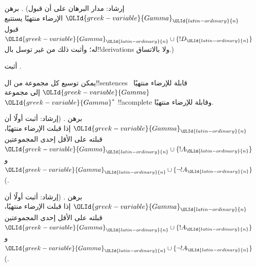 \documentclass[../../../include/open-logic-section]{subfiles}
\begin{document}
\begin{prob}
برهن . (إرشاد: مدار البرهان
على أن قبول ${\OLId{greek-variable}{Gamma}}_{\OLId{latin-ordinary}{n}}$ الإرضاء منتهيًا يستتبع قبول
${\OLId{greek-variable}{Gamma}}_{\OLId{latin-ordinary}{n}} \cup \{!D_{\OLId{latin-ordinary}{n}}\}$ له؛ وأثبت ذلك من غير توسل بال!!{derivation}s
ولا بالاتساق.)
\end{prob}
\tagendprob


\begin{prob}
أثبت .
\end{prob}
\tagendprob

\begin{lem}
 يمكن توسيع كل مجموعة من ال!!{sentence}s
قابلة للإرضاء منتهيًا~${\OLId{greek-variable}{Gamma}}$ إلى مجموعة~${\OLId{greek-variable}{Gamma}}^*$ !!a{complete}
وقابلة للإرضاء منتهيًا.
\end{lem}

\begin{prob}
برهن . (إرشاد: أثبت أولًا
أن ${\OLId{greek-variable}{Gamma}}_{\OLId{latin-ordinary}{n}}$ إذا قبلت الإرضاء منتهيًا، قبلته على الأقل إحدى
المجموعتين ${\OLId{greek-variable}{Gamma}}_{\OLId{latin-ordinary}{n}} \cup \{!A_{\OLId{latin-ordinary}{n}}\}$ و
${\OLId{greek-variable}{Gamma}}_{\OLId{latin-ordinary}{n}} \cup \{\lnot !A_{\OLId{latin-ordinary}{n}}\}$.)
\end{prob}
\tagendprob

\begin{prob}
برهن . (إرشاد: أثبت أولًا
أن ${\OLId{greek-variable}{Gamma}}_{\OLId{latin-ordinary}{n}}$ إذا قبلت الإرضاء منتهيًا، قبلته على الأقل إحدى
المجموعتين ${\OLId{greek-variable}{Gamma}}_{\OLId{latin-ordinary}{n}} \cup \{!A_{\OLId{latin-ordinary}{n}}\}$ و
${\OLId{greek-variable}{Gamma}}_{\OLId{latin-ordinary}{n}} \cup \{\lnot !A_{\OLId{latin-ordinary}{n}}\}$.)
\end{prob}
\tagendprob
\end{document}
